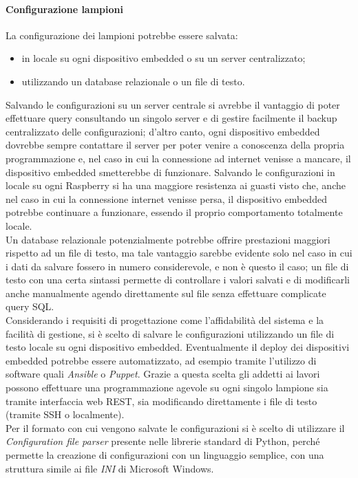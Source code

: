 \paragraph{Configurazione lampioni}
La configurazione dei lampioni potrebbe essere salvata:
\begin{itemize}
 \item in locale su ogni dispositivo embedded o su un server centralizzato;
 \item utilizzando un database relazionale o un file di testo.
\end{itemize}
Salvando le configurazioni su un server centrale si avrebbe il vantaggio di poter effettuare query consultando un singolo server e di gestire facilmente il backup centralizzato delle configurazioni;
d'altro canto, ogni dispositivo embedded dovrebbe sempre contattare il server per poter venire a conoscenza della propria programmazione e, nel caso in cui la connessione ad internet venisse a mancare, il dispositivo embedded smetterebbe di funzionare.
Salvando le configurazioni in locale su ogni Raspberry si ha una maggiore resistenza ai guasti visto che, anche nel caso in cui la connessione internet venisse persa, il dispositivo embedded potrebbe continuare a funzionare, essendo il proprio comportamento totalmente locale.
\\Un database relazionale potenzialmente potrebbe offrire prestazioni maggiori rispetto ad un file di testo, ma tale vantaggio sarebbe evidente solo nel caso in cui i dati da salvare fossero in numero considerevole, e non è questo il caso;
un file di testo con una certa sintassi permette di controllare i valori salvati e di modificarli anche manualmente agendo direttamente sul file senza effettuare complicate query SQL.
\\Considerando i requisiti di progettazione come l'affidabilità del sistema e la facilità di gestione, si è scelto di salvare le configurazioni utilizzando un file di testo locale su ogni dispositivo embedded.
Eventualmente il deploy dei dispositivi embedded potrebbe essere automatizzato, ad esempio tramite l'utilizzo di software quali \textit{Ansible} o \textit{Puppet}.
Grazie a questa scelta gli addetti ai lavori possono effettuare una programmazione agevole su ogni singolo lampione sia tramite interfaccia web REST, sia modificando direttamente i file di testo (tramite SSH o localmente).
\\Per il formato con cui vengono salvate le configurazioni si è scelto di utilizzare il \textit{Configuration file parser} presente nelle librerie standard di Python, perché permette la creazione di configurazioni con un linguaggio semplice, con una struttura simile ai file \textit{INI} di Microsoft Windows.
